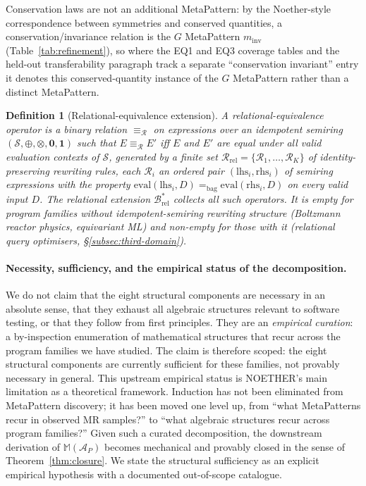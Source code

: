 \documentclass[acmsmall,screen,review]{acmart}
\newtheorem{definition}{Definition}
\begin{document}
Conservation laws are not an additional MetaPattern: by the Noether-style correspondence between symmetries and conserved quantities, a conservation/invariance relation is the $G$ MetaPattern $m_{\mathrm{inv}}$ (Table~\ref{tab:refinement}), so where the EQ1 and EQ3 coverage tables and the held-out transferability paragraph track a separate ``conservation invariant'' entry it denotes this conserved-quantity instance of the $G$ MetaPattern rather than a distinct MetaPattern.

\begin{definition}[Relational-equivalence extension]
\label{def:b-rel}
A \emph{relational-equivalence operator} is a binary relation $\equiv_{\mathcal{R}}$ on expressions over an idempotent semiring $(\mathcal{S}, \oplus, \otimes, \mathbf{0}, \mathbf{1})$ such that $E \equiv_{\mathcal{R}} E'$ iff $E$ and $E'$ are equal under all valid evaluation contexts of $\mathcal{S}$, generated by a finite set $\mathcal{R}_{\mathrm{rel}} = \{\mathcal{R}_1, \dots, \mathcal{R}_K\}$ of identity-preserving rewriting rules, each $\mathcal{R}_i$ an ordered pair $(\mathrm{lhs}_i, \mathrm{rhs}_i)$ of semiring expressions with the property $\mathrm{eval}(\mathrm{lhs}_i, D) =_{\mathrm{bag}} \mathrm{eval}(\mathrm{rhs}_i, D)$ on every valid input $D$. The relational extension $\mathcal{B}^{*}_{\mathrm{rel}}$ collects all such operators. It is empty for program families without idempotent-semiring rewriting structure (Boltzmann reactor physics, equivariant ML) and non-empty for those with it (relational query optimisers, \S\ref{subsec:third-domain}).
\end{definition}

\paragraph{Necessity, sufficiency, and the empirical status of the decomposition.} We do not claim that the eight structural components are necessary in an absolute sense, that they exhaust all algebraic structures relevant to software testing, or that they follow from first principles. They are an \emph{empirical curation}: a by-inspection enumeration of mathematical structures that recur across the program families we have studied. The claim is therefore scoped: the eight structural components are currently sufficient for these families, not provably necessary in general. This upstream empirical status is NOETHER's main limitation as a theoretical framework. Induction has not been eliminated from MetaPattern discovery; it has been moved one level up, from ``what MetaPatterns recur in observed MR samples?'' to ``what algebraic structures recur across program families?'' Given such a curated decomposition, the downstream derivation of $\mathbb{M}(\mathcal{A}_P)$ becomes mechanical and provably closed in the sense of Theorem~\ref{thm:closure}. We state the structural sufficiency as an explicit empirical hypothesis with a documented out-of-scope catalogue.
\end{document}
